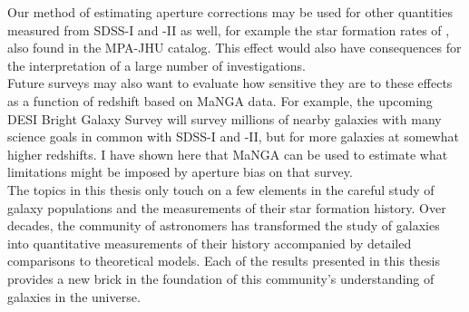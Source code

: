 Our method of estimating aperture corrections may be 
used for other quantities measured from SDSS-I and -II as
well, for example the star formation rates of \citet{brinchmann_physical_2004}, also found in the 
MPA-JHU catalog. This effect would also have
consequences for the interpretation of 
a large number of investigations.\\

Future surveys may also want to evaluate how sensitive 
they are to these effects as a function of redshift based
on MaNGA data. For example, the upcoming DESI Bright Galaxy
Survey \citep{desi16a} will survey millions of nearby
galaxies with many science goals in common with 
SDSS-I and -II, but for more galaxies at somewhat
higher redshifts. I have shown here that MaNGA can be used
to estimate what limitations might be imposed by aperture bias 
on that survey.\\

The topics in this thesis only touch on a few elements in 
the careful study of galaxy populations and the measurements
of their star formation history. 
Over decades, the community of astronomers has transformed
the study of galaxies into quantitative measurements
of their history accompanied by detailed comparisons to
theoretical models. Each of the results presented in this
thesis provides a new brick in the foundation of this 
community's understanding of galaxies in the universe.

